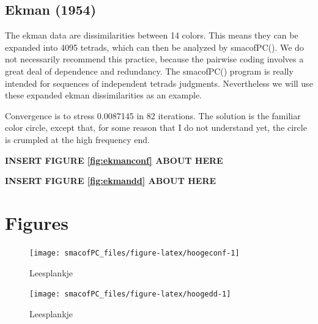 \documentclass[
  12pt,
]{article}
\begin{document}
\subsection{Ekman (1954)}\label{ekman_54}

The ekman data are dissimilarities between 14 colors. This means they can be
expanded into 4095 tetrads, which can then be
analyzed by smacofPC(). We do not necessarily recommend this practice, because
the pairwise coding involves a great deal of dependence and redundancy.
The smacofPC() program is really intended for sequences of independent tetrads judgments. Nevertheless we will use these expanded ekman dissimilarities as an example.

Convergence is to stress 0.0087145 in 82 iterations. The solution is the
familiar color circle, except that, for some reason that I do not understand yet, the circle is crumpled at the high frequency
end.

\begin{greybox}

\begin{center}
\textbf{INSERT FIGURE \ref{fig:ekmanconf} ABOUT HERE}

\end{center}

\end{greybox}

\begin{greybox}

\begin{center}
\textbf{INSERT FIGURE \ref{fig:ekmandd} ABOUT HERE}

\end{center}

\end{greybox}

\section{Figures}\label{figures}

\begin{figure}

{\centering \texttt{[image: smacofPC\_files/figure-latex/hoogeconf-1]} 

}

\caption{Leesplankje}\label{fig:hoogeconf}
\end{figure}

\begin{figure}

{\centering \texttt{[image: smacofPC\_files/figure-latex/hoogedd-1]} 

}

\caption{Leesplankje}\label{fig:hoogedd}
\end{figure}
\end{document}
